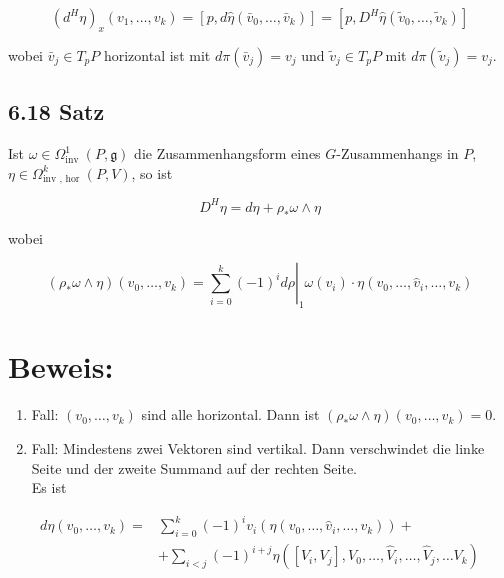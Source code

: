 \documentclass[10pt, letterpaper]{article}
\begin{document}
$$
\left(d^{H} \eta\right)_{x}\left(v_{1}, \ldots, v_{k}\right)=\left[p, d \hat{\eta}\left(\bar{v}_{0}, \ldots, \bar{v}_{k}\right)\right]=\left[p, D^{H} \hat{\eta}\left(\tilde{v}_{0}, \ldots, \tilde{v}_{k}\right)\right]
$$

wobei $\bar{v}_{j} \in T_{p} P$ horizontal ist mit $d \pi\left(\bar{v}_{j}\right)=v_{j}$ und $\tilde{v}_{j} \in T_{p} P$ mit $d \pi\left(\tilde{v}_{j}\right)=v_{j}$.

\subsection*{6.18 Satz}
Ist $\omega \in \Omega_{\text {inv }}^{1}(P, \mathfrak{g})$ die Zusammenhangsform eines $G$-Zusammenhangs in $P$, $\eta \in \Omega_{\text {inv }, \text { hor }}^{k}(P, V)$, so ist

$$
D^{H} \eta=d \eta+\rho_{*} \omega \wedge \eta
$$

wobei

$$
\left(\rho_{*} \omega \wedge \eta\right)\left(v_{0}, \ldots, v_{k}\right)=\left.\sum_{i=0}^{k}(-1)^{i} d \rho\right|_{1} \omega\left(v_{i}\right) \cdot \eta\left(v_{0}, \ldots, \hat{v}_{i}, \ldots, v_{k}\right)
$$

\section*{Beweis:}
\begin{enumerate}
  \item Fall: $\left(v_{0}, \ldots, v_{k}\right)$ sind alle horizontal. Dann ist $\left(\rho_{*} \omega \wedge \eta\right)\left(v_{0}, \ldots, v_{k}\right)=0$.
  \item Fall: Mindestens zwei Vektoren sind vertikal. Dann verschwindet die linke Seite und der zweite Summand auf der rechten Seite.\\
Es ist
\end{enumerate}

$$
\begin{aligned}
d \eta\left(v_{0}, \ldots, v_{k}\right)= & \sum_{i=0}^{k}(-1)^{i} v_{i}\left(\eta\left(v_{0}, \ldots, \hat{v}_{i}, \ldots, v_{k}\right)\right)+ \\
& +\sum_{i<j}(-1)^{i+j} \eta\left(\left[V_{i}, V_{j}\right], V_{0}, \ldots, \hat{V}_{i}, \ldots, \hat{V}_{j}, \ldots V_{k}\right)
\end{aligned}
$$
\end{document}
